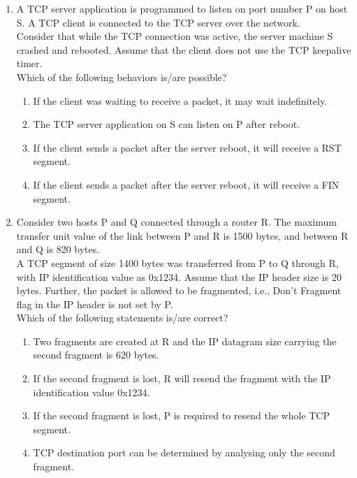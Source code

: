 \documentclass[a4paper, 11pt]{article}
\begin{document}
\begin{enumerate}
    \item A TCP server application is programmed to listen on port number P on host S. A TCP client is connected to the TCP server over the network.\\Consider that while the TCP connection was active, the server machine S crashed and rebooted. Assume that the client does not use the TCP keepalive timer.\\Which of the following behaviors is/are possible?
    \begin{enumerate}
        \item If the client was waiting to receive a packet, it may wait indefinitely.
        \item The TCP server application on S can listen on P after reboot.
        \item If the client sends a packet after the server reboot, it will receive a RST segment.
        \item If the client sends a packet after the server reboot, it will receive a FIN segment.
    \end{enumerate}
    \hfill{}
    
    \item Consider two hosts P and Q connected through a router R. The maximum transfer unit  value of the link between P and R is 1500 bytes, and between R and Q is 820 bytes.\\A TCP segment of size 1400 bytes was transferred from P to Q through R, with IP identification value as 0x1234. Assume that the IP header size is 20 bytes. Further, the packet is allowed to be fragmented, i.e., Don't Fragment  flag in the IP header is not set by P.\\Which of the following statements is/are correct?
    \begin{enumerate}
        \item Two fragments are created at R and the IP datagram size carrying the second fragment is 620 bytes.
        \item If the second fragment is lost, R will resend the fragment with the IP identification value 0x1234.
        \item If the second fragment is lost, P is required to resend the whole TCP segment.
        \item TCP destination port can be determined by analysing only the second fragment.
    \end{enumerate}
    \hfill{}
    

\end{enumerate}
\end{document}
